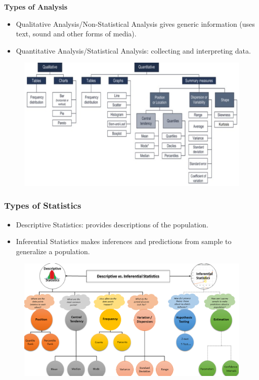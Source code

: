 \documentclass{beamer}
\begin{document}
\begin{frame}\textbf{Types of Analysis}
\begin{itemize}
\item Qualitative Analysis/Non-Statistical Analysis gives generic information (uses text, sound and other forms of media).
\item Quantitative Analysis/Statistical Analysis: collecting and interpreting data.

\end{itemize}
\begin{figure}
\includegraphics[scale=0.3]{QuantitativeQualitative} 
\end{figure}
\end{frame}



\begin{frame}\frametitle{Types of Statistics}
\begin{itemize}
\item Descriptive Statistics: provides descriptions of the population.
\item Inferential Statistics makes inferences and predictions from sample to generalize a population. 
\end{itemize}

\begin{figure}
\includegraphics[scale=0.29]{DescriptiveInferential} 
\end{figure}
\end{frame}
\end{document}
